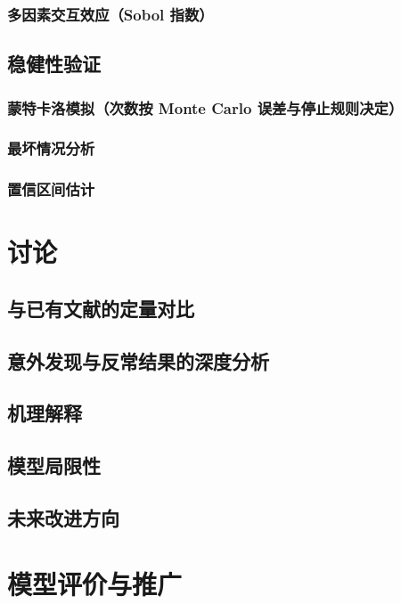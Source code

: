 \documentclass[12pt,a4paper]{ctexart}
\begin{document}
\subsubsection{多因素交互效应（Sobol 指数）}
\subsection{稳健性验证}
\subsubsection{蒙特卡洛模拟（次数按 Monte Carlo 误差与停止规则决定）}
\subsubsection{最坏情况分析}
\subsubsection{置信区间估计}

\section{讨论}  %
\subsection{与已有文献的定量对比}  %
\subsection{意外发现与反常结果的深度分析}
\subsection{机理解释}  %
\subsection{模型局限性}  %
\subsection{未来改进方向}  %

\section{模型评价与推广}
\end{document}
